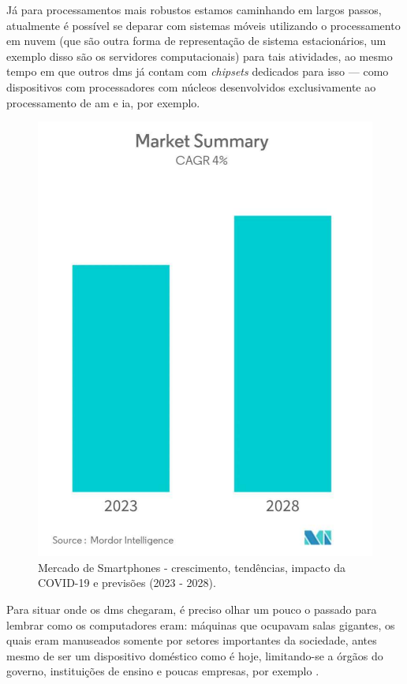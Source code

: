 Já para processamentos mais robustos estamos caminhando em largos passos, atualmente é possível se deparar com sistemas móveis utilizando o processamento em nuvem (que são outra forma de representação de sistema estacionários, um exemplo disso são os servidores computacionais) para tais atividades, ao mesmo tempo em que outros \acp{dm} já contam com \textit{chipsets} dedicados para isso — como dispositivos com processadores com núcleos desenvolvidos exclusivamente ao processamento de \ac{am} e \ac{ia}, por exemplo.

\begin{figure}[h]
\centering
  \includegraphics[width=\columnwidth/3]{images/smartphones-market_Market_Summary.pdf}
  \caption{Mercado de Smartphones - crescimento, tendências, impacto da COVID-19 e previsões (2023 - 2028).}
  \label{fig:smartphones-market_Market_Summary}
\end{figure}

Para situar onde os \acp{dm} chegaram, é preciso olhar um pouco o passado para lembrar como os computadores eram: máquinas que ocupavam salas gigantes, os quais eram manuseados somente por setores importantes da sociedade, antes mesmo de ser um dispositivo doméstico como é hoje, limitando-se a órgãos do governo, instituições de ensino e poucas empresas, por exemplo \citet{alecrim_2013}.

